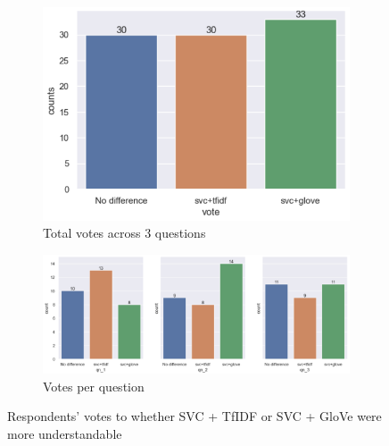 \begin{figure}[!ht]
  \centering
    \begin{subfigure}[b]{0.75\textwidth}
      \includegraphics[width=1\linewidth]{figures/part5_votes.png}
      \caption{Total votes across 3 questions}
    \end{subfigure}
    \hfill
    \centering
    \begin{subfigure}[b]{1\textwidth}
      \includegraphics[width=1\linewidth]{figures/part_5_votes_1.png}
      \caption{Votes per question}
    \end{subfigure}
    \caption{Respondents' votes to whether SVC + TfIDF or SVC + GloVe were more understandable}
    \label{fig:part5}
\end{figure}
